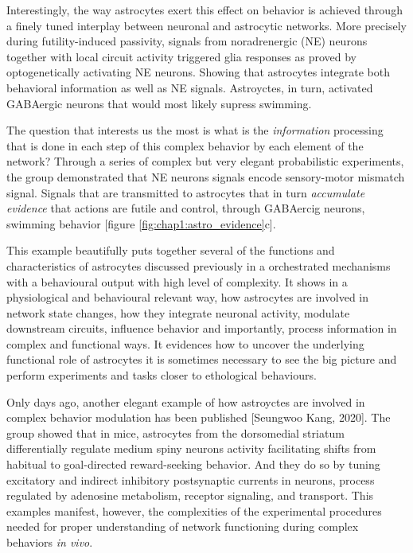 Interestingly, the way astrocytes exert this effect on behavior is achieved through a finely tuned interplay between neuronal and astrocytic networks. 
More precisely during futility-induced passivity, signals from noradrenergic (NE) neurons together with local circuit activity triggered glia responses as proved by optogenetically activating NE neurons. 
Showing that astrocytes integrate both behavioral information as well as NE signals.
Astroyctes, in turn, activated GABAergic neurons that would most likely supress swimming. 

The question that interests us the most is what is the \textit{information} processing that is done in each step of this complex behavior by each element of the network? 
Through a series of complex but very elegant probabilistic experiments, the group demonstrated that NE neurons signals encode sensory-motor mismatch signal.
Signals that are transmitted to astrocytes that in turn \textit{accumulate evidence} that actions are futile and control, through GABAercig neurons, swimming behavior [figure \ref{fig:chap1:astro_evidence}c]. 

This example beautifully puts together several of the functions and characteristics of astrocytes discussed previously in a orchestrated mechanisms with a behavioural output with high level of complexity. 
It shows in a physiological and behavioural relevant way, how astrocytes are involved in network state changes, how they integrate neuronal activity, modulate downstream circuits, influence behavior and importantly, process information in complex and functional ways.  
It evidences how to uncover the underlying functional role of astrocytes it is sometimes necessary to see the big picture and perform experiments and tasks closer to ethological behaviours.  

Only days ago, another elegant example of how astroyctes are involved in complex behavior modulation has been published [Seungwoo Kang, 2020]. 
The group showed that in mice, astrocytes from the dorsomedial striatum differentially regulate medium spiny neurons activity facilitating shifts from habitual to goal-directed reward-seeking behavior.
And they do so by tuning excitatory and indirect inhibitory postsynaptic currents in neurons, process regulated by adenosine metabolism, receptor signaling, and transport. 
This examples manifest, however, the complexities of the experimental procedures needed for proper understanding of network functioning during complex behaviors \textit{in vivo}.
